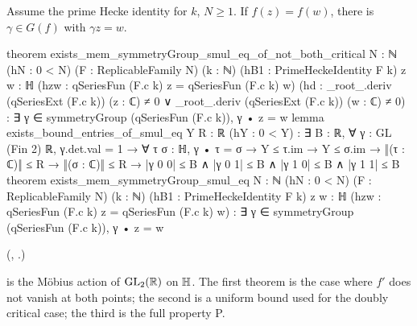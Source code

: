 \begin{theorem}[Property P]\label{ch19:thm:propP}
Assume the prime Hecke identity for $k$, $N\ge1$.  If $f(z)=f(w)$, there is $\gamma\in G(f)$ with $\gamma z=w$.
\end{theorem}
\begin{leancode}
theorem exists_mem_symmetryGroup_smul_eq_of_not_both_critical {N : ℕ} (hN : 0 < N)
    (F : ReplicableFamily N) (k : ℕ) (hB1 : PrimeHeckeIdentity F k) {z w : ℍ}
    (hzw : qSeriesFun (F.c k) z = qSeriesFun (F.c k) w)
    (hd : _root_.deriv (qSeriesExt (F.c k)) (z : ℂ) ≠ 0 ∨
      _root_.deriv (qSeriesExt (F.c k)) (w : ℂ) ≠ 0) :
    ∃ γ ∈ symmetryGroup (qSeriesFun (F.c k)), γ • z = w
lemma exists_bound_entries_of_smul_eq {Y R : ℝ} (hY : 0 < Y) :
    ∃ B : ℝ, ∀ γ : GL (Fin 2) ℝ, γ.det.val = 1 → ∀ τ σ : ℍ, γ • τ = σ → Y ≤ τ.im → Y ≤ σ.im →
      ‖(τ : ℂ)‖ ≤ R → ‖(σ : ℂ)‖ ≤ R →
        |γ 0 0| ≤ B ∧ |γ 0 1| ≤ B ∧ |γ 1 0| ≤ B ∧ |γ 1 1| ≤ B
theorem exists_mem_symmetryGroup_smul_eq {N : ℕ} (hN : 0 < N) (F : ReplicableFamily N) (k : ℕ)
    (hB1 : PrimeHeckeIdentity F k) {z w : ℍ}
    (hzw : qSeriesFun (F.c k) z = qSeriesFun (F.c k) w) :
    ∃ γ ∈ symmetryGroup (qSeriesFun (F.c k)), γ • z = w
\end{leancode}
(, .)
\begin{dictionary}
 is the M\"obius action of $\mathrm{GL}_2(\mathbb{R})$ on $\mathbb{H}$.  The first theorem is the case where $f'$ does not vanish at both
points; the second is a uniform bound used for the doubly critical case; the third is the full property P.
\end{dictionary}
